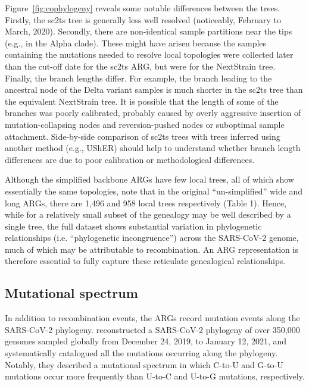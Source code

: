 \documentclass{article}
\begin{document}
Figure~\ref{fig:cophylogeny} reveals some notable differences between the
trees. Firstly, the sc2ts tree is generally less well resolved (noticeably,
February to March, 2020). Secondly, there are non-identical sample partitions
near the tips (e.g., in the Alpha clade). These might have arisen because the
samples containing the mutations needed to resolve local topologies were
collected later than the cut-off date for the sc2ts ARG, but were for the
NextStrain tree. Finally, the branch lengths differ. For example, the branch
leading to the ancestral node of the Delta variant samples is much shorter in
the sc2ts tree than the equivalent NextStrain tree. It is possible that the
length of some of the branches was poorly calibrated, probably caused by overly
aggressive insertion of mutation-collapsing nodes and reversion-pushed nodes or
suboptimal sample attachment. Side-by-side comparison of sc2ts trees with trees
inferred using another method (e.g., UShER) should help to understand whether
branch length differences are due to poor calibration or methodological
differences.

Although the simplified backbone ARGs have few local trees, all of which show
essentially the same topologies, note that in the original ``un-simplified''
wide and long ARGs, there are 1,496 and 958 local trees respectively (Table 1).
Hence, while for a relatively small subset of the genealogy may be well
described by a single tree, the full dataset shows substantial variation in
phylogenetic relationships (i.e. ``phylogenetic incongruence'') across the
SARS-CoV-2 genome, much of which may be attributable to recombination. An ARG
representation is therefore essential to fully capture these reticulate
genealogical relationships.

\subsection{Mutational spectrum}
 In addition to recombination events, the ARGs record mutation events along the
SARS-CoV-2 phylogeny. \cite{Yi2021-sc} reconstructed a SARS-CoV-2 phylogeny of
over 350,000 genomes sampled globally from December 24, 2019, to January 12,
2021, and systematically catalogued all the mutations occurring along the
phylogeny. Notably, they described a mutational spectrum in which C-to-U and
G-to-U mutations occur more frequently than U-to-C and U-to-G mutations,
respectively.
\end{document}
